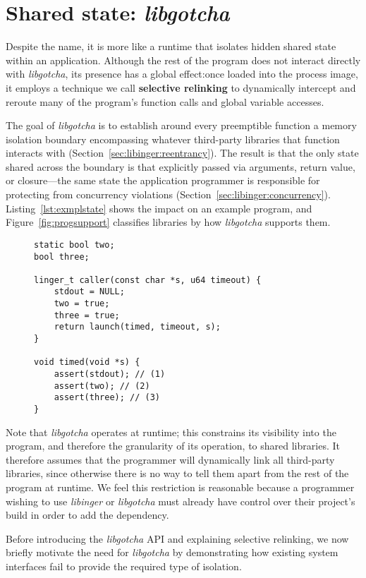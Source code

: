 \section{Shared state: \textit{libgotcha}}
\label{sec:libgotcha}

Despite the name, it is more like a runtime that isolates hidden shared state
within an application.  Although the rest of the
program does not interact directly with \textit{libgotcha}, its presence has a
global effect:\@ once loaded into the process image, it employs a technique we call
\textbf{selective relinking} to dynamically intercept and reroute many of the
program's function
calls and global variable accesses.

The goal of \textit{libgotcha} is to establish around every preemptible function a
memory isolation boundary encompassing whatever third-party libraries that function
interacts with (Section~\ref{sec:libinger:reentrancy}).  The result is that the only
state shared across the boundary is that explicitly passed via arguments,
return value, or closure---the same state the application programmer is responsible
for protecting from concurrency violations (Section~\ref{sec:libinger:concurrency}).
Listing~\ref{lst:exmplstate} shows the impact on an example program, and
Figure~\ref{fig:progsupport} classifies libraries by how \textit{libgotcha} supports
them.

\begin{figure}
\begin{lstlisting}[label=lst:exmplstate,caption=Demo of isolated \textnormal{(1)} vs.\ shared \textnormal{(2\&3)} state]
static bool two;
bool three;

linger_t caller(const char *s, u64 timeout) {
	stdout = NULL;
	two = true;
	three = true;
	return launch(timed, timeout, s);
}

void timed(void *s) {
	assert(stdout); // (1)
	assert(two); // (2)
	assert(three); // (3)
}
\end{lstlisting}
\end{figure}

Note that \textit{libgotcha} operates at runtime; this constrains its visibility
into the program, and therefore the granularity of its operation, to shared
libraries.  It therefore
assumes that the programmer will dynamically link all third-party libraries, since
otherwise there is no way to tell them apart from the rest of the program at runtime.
We feel this restriction is reasonable because a programmer wishing to use
\textit{libinger} or \textit{libgotcha} must already have control over their
project's build in order to add the dependency.

Before introducing the \textit{libgotcha} API and explaining selective relinking, we
now briefly motivate the need for \textit{libgotcha} by demonstrating how existing
system interfaces fail to provide the required type of isolation.
